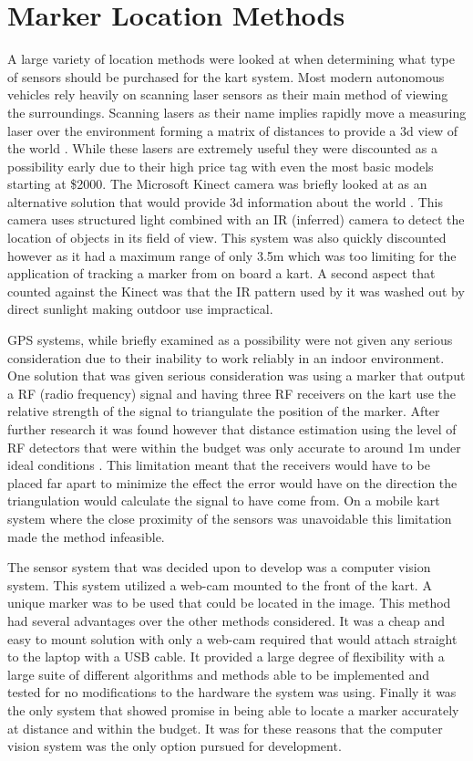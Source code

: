 \section{Marker Location Methods}

A large variety of location methods were looked at when determining what type of sensors should be purchased for the kart system. Most modern autonomous vehicles rely heavily on scanning laser sensors as their main method of viewing the surroundings. Scanning lasers as their name implies rapidly move a measuring laser over the environment forming a matrix of distances to provide a 3d view of the world \cite{laser}. While these lasers are extremely useful they were discounted as a possibility early due to their high price tag with even the most basic models starting at \$2000. The Microsoft Kinect camera was briefly looked at as an alternative solution that would provide 3d information about the world \cite{kinect}. This camera uses structured light combined with an IR (inferred) camera to detect the location of objects in its field of view. This system was also quickly discounted however as it had a maximum range of only 3.5m which was too limiting for the application of tracking a marker from on board a kart. A second aspect that counted against the Kinect was that the IR pattern used by it was washed out by direct sunlight making outdoor use impractical.

GPS systems, while briefly examined as a possibility were not given any serious consideration due to their inability to work reliably in an indoor environment. One solution that was given serious consideration was using a marker that output a RF (radio frequency) signal and having three RF receivers on the kart use the  relative strength of the signal to triangulate the position of the marker. After further research it was found however that distance estimation using the level of RF detectors that were within the budget was only accurate to around 1m under ideal conditions \cite{rf}. This limitation meant that the receivers would have to be placed far apart to minimize the effect the error would have on the direction the triangulation would calculate the signal to have come from. On a mobile kart system where the close proximity of the sensors was unavoidable this limitation made the method infeasible.

The sensor system that was decided upon to develop was a computer vision system. This system utilized a web-cam mounted to the front of the kart. A unique marker was to be used that could be located in the image. This method had several advantages over the other methods considered. It was a cheap and easy to mount solution with only a web-cam required that would attach straight to the laptop with a USB cable. It provided a large degree of flexibility with a large suite of different algorithms and methods able to be implemented and tested for no modifications to the hardware the system was using. Finally it was the only system that showed promise in being able to locate a marker accurately at distance and within the budget. It was for these reasons that the computer vision system was the only option pursued for development.
